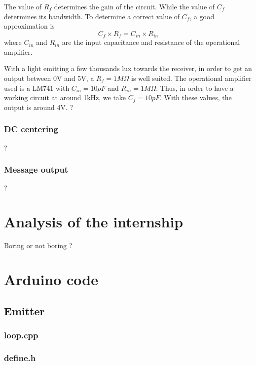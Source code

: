 \documentclass[12pt]{report}
\begin{document}
The value of $R_f$ determines the gain of the circuit. While the value of $C_f$ determines its bandwidth. To determine a correct value of $C_f$, a good approximation is $$C_f \times R_f = C_{in} \times R_{in}$$ where $C_{in}$ and $R_{in}$ are the input capacitance and resistance of the operational amplifier.

With a light emitting a few thousands lux towards the receiver, in order to get an output between 0V and 5V, a $R_f = 1M\Omega$ is well suited.
 The operational amplifier used is a LM741 with $C_{in} = 10pF$ and $R_{in} = 1M\Omega$. Thus, in order to have a working circuit at around 1kHz, we take $C_f = 10pF$.
With these values, the output is around 4V. ?

\subsection{DC centering}

?

\subsection{Message output}

?



\chapter{Analysis of the internship}

Boring or not boring ?



\appendix

\chapter{Arduino code}

\section{Emitter}

\subsection{loop.cpp}



\subsection{define.h}
\end{document}

